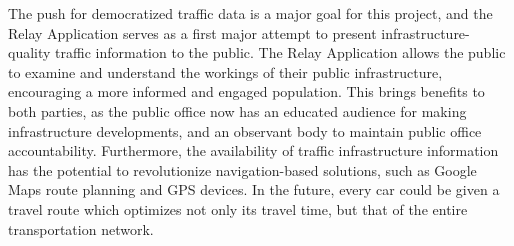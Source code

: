 \documentclass{report}
\begin{document}
The push for democratized traffic data is a major goal for this project, and the Relay Application serves as a first major attempt to present infrastructure-quality traffic information to the public. 
The Relay Application allows the public to examine and understand the workings of their public infrastructure, encouraging a more informed and engaged population. 
This brings benefits to both parties, as the public office now has an educated audience for making infrastructure developments, and an observant body to maintain public office accountability. 
Furthermore, the availability of traffic infrastructure information has the potential to revolutionize navigation-based solutions, such as Google Maps route planning and GPS devices.
In the future, every car could be given a travel route which optimizes not only its travel time, but that of the entire transportation network.

\newpage
{}


\end{document}
